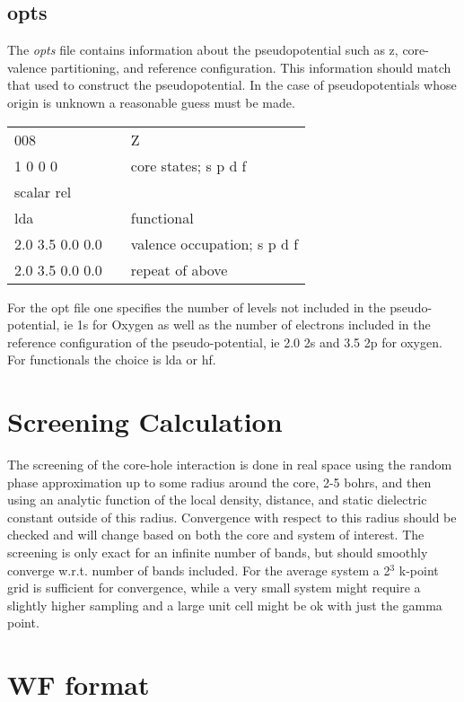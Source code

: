 \documentclass[12pt]{revtex4}
\begin{document}
\subsection{opts}
The \emph{opts} file contains information about the pseudopotential such as z, core-valence partitioning, and reference configuration. This information should match that used to construct the pseudopotential. In the case of pseudopotentials 
whose origin is unknown a reasonable guess must be made.

\begin{center}
\begin{tabular}{| l | c l |}
\hline
008				& &  Z\\
1 0 0 0			& & core states; s p d f \\
scalar rel			& & \\
lda				& & functional \\
2.0 3.5 0.0 0.0		& & valence occupation; s p d f \\
2.0 3.5 0.0 0.0		& & repeat of above \\
\hline
\end{tabular}
\end{center}

For the opt file one specifies the number of levels not included in the pseudo-potential, ie 1s for Oxygen as well as the number of electrons included in the reference configuration of the pseudo-potential, ie 2.0 2s and 3.5 2p for oxygen. For functionals the choice is lda or hf. 

\section{Screening Calculation}

The screening of the core-hole interaction is done in real space using the random phase approximation up to some radius around the core, 2-5 bohrs, and then using an analytic function of the local density, distance, and static dielectric constant outside of this radius. Convergence with respect to this radius should be checked and will change based on both the core and system of interest. The screening is only exact for an infinite number of bands, but should smoothly converge w.r.t. number of bands included. For the average system a 2$^3$ k-point grid is sufficient for convergence, while a very small system might require a slightly higher sampling and a large unit cell might be ok with just the gamma point.


\appendix
\section{WF format}\label{WF_format}
\end{document}
